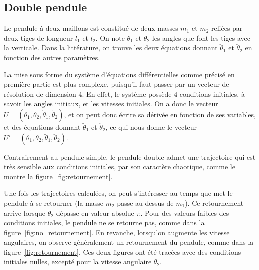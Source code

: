 \subsection{Double pendule}

Le pendule à deux maillons est constitué de deux masses $ m_1 $ et $ m_2 $ 
reliées par deux tiges de longueur $ l_1 $ et $ l _2 $. On note $ \theta_1 $ et $ \theta_2 $ les angles
que font les tiges avec la verticale. Dans la littérature, on trouve les deux équations donnant $\ddot \theta_1$ et $\ddot \theta_2$ en fonction des autres paramètres.

La mise sous forme du système d'équations différentielles comme précisé en première partie est plus complexe,
puisqu'il faut passer par un vecteur de résolution de dimension $4$.
En effet, le système possède $4$ conditions initiales, à savoir les angles initiaux, et les vitesses initiales.
On a donc le vecteur $ U = (\theta_1, \theta_2, \dot \theta_1, \dot \theta_2) $, et on peut donc écrire sa dérivée en fonction de ses variables, et des équations donnant $\ddot \theta_1$ et $\ddot \theta_2$,
ce qui nous donne le vecteur $ U' = (\dot \theta_1, \dot \theta_2, \ddot \theta_1, \ddot \theta_2) $.

Contrairement au pendule simple, le pendule double admet une trajectoire qui est très sensible aux conditions initiales, par son caractère chaotique, comme le montre la figure~\ref{fig:retournement}.

Une fois les trajectoires calculées, on peut s'intéresser au temps que met le pendule à se retourner (la masse $ m_2 $ passe au
dessus de $ m_1 $).
Ce retournement arrive lorsque $ \theta_2 $ dépasse en valeur absolue $ \pi $.
Pour des valeurs faibles des conditions initiales, le pendule ne se retourne pas, comme dans la figure~\ref{fig:no_retournement}.
En revanche, lorsqu'on augmente les vitesse angulaires, on observe généralement un retournement du pendule, comme dans la figure~\ref{fig:retournement}.
Ces deux figures ont été tracées avec des conditions initiales nulles, excepté pour la vitesse angulaire $ \dot \theta_2 $.


